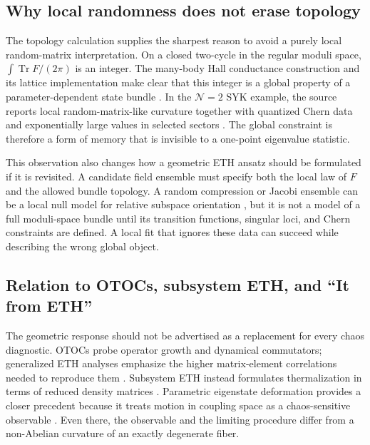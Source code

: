 \subsection{Why local randomness does not erase topology}

The topology calculation supplies the sharpest reason to avoid a purely local
random-matrix interpretation.  On a closed two-cycle in the regular moduli
space, $\int\operatorname{Tr}F/(2\pi)$ is an integer.  The many-body Hall
conductance construction and its lattice implementation make clear that this
integer is a global property of a parameter-dependent state bundle
\cite{niu1985,fukui2005}.  In the $\mathcal{N}=2$ SYK example, the
source reports local random-matrix-like curvature together with quantized
Chern data and exponentially large values in selected sectors
\cite{chen2026berry}.  The global constraint is therefore a form of memory
that is invisible to a one-point eigenvalue statistic.

This observation also changes how a geometric ETH ansatz should be formulated
if it is revisited.  A candidate field ensemble must specify both the local
law of $F$ and the allowed bundle topology.  A random compression or Jacobi
ensemble can be a local null model for relative subspace orientation
\cite{collins2005,zyczkowski2000}, but it is not a model of a full moduli-space
bundle until its transition functions, singular loci, and Chern constraints
are defined.  A local fit that ignores these data can succeed while describing
the wrong global object.

\subsection{Relation to OTOCs, subsystem ETH, and ``It from ETH''}

The geometric response should not be advertised as a replacement for every
chaos diagnostic.  OTOCs probe operator growth and dynamical commutators;
generalized ETH analyses emphasize the higher matrix-element correlations
needed to reproduce them \cite{foinikurchan2019}.  Subsystem ETH instead
formulates thermalization in terms of reduced density matrices
\cite{dymarsky2016subsystemeth,lashkari2016cfteth}.  Parametric eigenstate
deformation provides a closer precedent because it treats motion in coupling
space as a chaos-sensitive observable \cite{pandey2020}.  Even there, the
observable and the limiting procedure differ from a non-Abelian curvature of
an exactly degenerate fiber.

